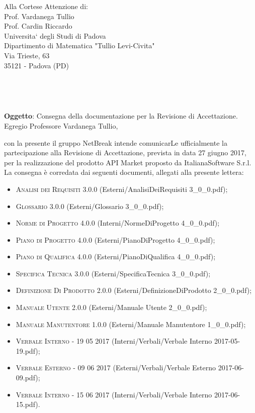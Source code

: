 \documentclass[11pt,a4paper]{letter}
\def\opening#1{\thispagestyle{empty}
{\centering\fromaddress \vspace{0.6in} \\ %
\hspace*{\longindentation}\hspace*{\fill}\par} %
{\raggedright \toname \\ \toaddress \par} %
\vspace{0.1in} %
\noindent #1 %
}
\begin{document}

\begin{letter}
{Alla Cortese Attenzione di:\\
	Prof. Vardanega Tullio\\
	Prof. Cardin Riccardo\\
	Universita` degli Studi di Padova\\
	Dipartimento di Matematica "Tullio Levi-Civita"\\
	Via Trieste, 63\\
	35121 - Padova (PD)\\
}


\opening{\textbf{Oggetto}: Consegna della documentazione per la Revisione di Accettazione.}\\

\noindent Egregio Professore Vardanega Tullio,

\indent con la presente il gruppo NetBreak intende comunicarLe ufficialmente la partecipazione alla Revisione di Accettazione, prevista in data 27 giugno 2017, per la realizzazione del prodotto API Market proposto da ItalianaSoftware S.r.l.\\
La consegna \`e corredata dai seguenti documenti, allegati alla presente lettera:

\begin{itemize}
	\item \textsc{Analisi dei Requisiti 3.0.0} (Esterni/AnalisiDeiRequisiti 3\_0\_0.pdf); 
	\item \textsc{Glossario 3.0.0} (Esterni/Glossario 3\_0\_0.pdf); 
	\item \textsc{Norme di Progetto 4.0.0} (Interni/NormeDiProgetto 4\_0\_0.pdf); 
	\item \textsc{Piano di Progetto 4.0.0} (Esterni/PianoDiProgetto 4\_0\_0.pdf); 
	\item \textsc{Piano di Qualifica 4.0.0} (Esterni/PianoDiQualifica 4\_0\_0.pdf); 
	\item \textsc{Specifica Tecnica 3.0.0} (Esterni/SpecificaTecnica 3\_0\_0.pdf);
	\item \textsc{Definizione Di Prodotto 2.0.0} (Esterni/DefinizioneDiProdotto 2\_0\_0.pdf);
	\item \textsc{Manuale Utente 2.0.0} (Esterni/Manuale Utente 2\_0\_0.pdf);
	\item \textsc{Manuale Manutentore 1.0.0} (Esterni/Manuale Manutentore 1\_0\_0.pdf);
	\item \textsc{Verbale Interno - 19 05 2017} (Interni/Verbali/Verbale Interno 2017-05-19.pdf);
	\item \textsc{Verbale Esterno - 09 06 2017} (Esterni/Verbali/Verbale Esterno 2017-06-09.pdf);
	\item \textsc{Verbale Interno - 15 06 2017} (Interni/Verbali/Verbale Interno 2017-06-15.pdf).
\end{itemize}


\end{letter}
\end{document}
